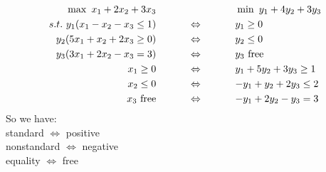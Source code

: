 \documentclass[12 pt]{article}
\begin{document}
          \begin{align*}
            \max \ x_1 + 2x_2 + 3x_3  &\hspace{80 pt} \min \ y_1 + 4y_2 + 3y_3
            \\ s.t. \ y_1 (x_1 - x_2 - x_3  \leq 1)  & \hspace{32 pt}\Leftrightarrow \hspace{32 pt}
                                        y_1 \geq 0
            \\ y_2(5x_1 + x_2 + 2x_3 \geq 0) & \hspace{32 pt} \Leftrightarrow \hspace{32 pt} y_2 \leq 0
            \\ y_3(3x_1 + 2x_2 - x_3 = 3) & \hspace{32 pt} \Leftrightarrow \hspace{32 pt} y_3
                                                              \text{ free} 
            \\ x_1 \geq 0 &\hspace{32 pt} \Leftrightarrow \hspace{32 pt} y_1+5y_2+3y_3 \geq 1
            \\ x_2 \leq 0 & \hspace{32 pt} \Leftrightarrow \hspace{32 pt} -y_1 + y_2 + 2y_3 \leq 2 
            \\ x_3 \text{ free} &\hspace{32 pt} \Leftrightarrow \hspace{32 pt}  -y_1 + 2y_2 - y_3 = 3 
          \end{align*}
          So we have: \\
          standard $\Leftrightarrow$ positive
          \\ nonstandard $\Leftrightarrow$ negative
          \\ equality $\Leftrightarrow$ free
\end{document}

